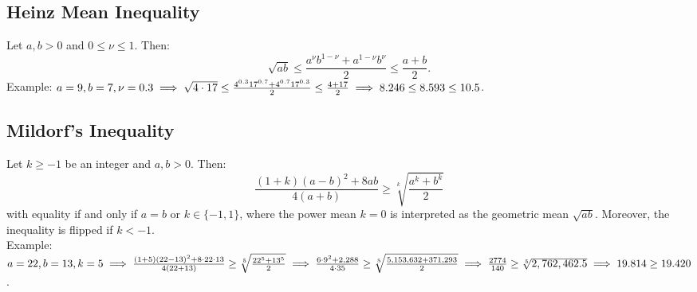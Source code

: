 \documentclass[a4paper,11pt]{article}
\begin{document}
\subsection{Heinz Mean Inequality}
\begin{tcolorbox}[breakable]
    Let $a,b>0$ and $0\leq\nu\leq1$. Then:
    \[
    \sqrt{ab} \leq \frac{a^{\nu}b^{1-\nu} + a^{1-\nu}b^{\nu}}{2} \leq \frac{a+b}{2}.
    \]
    Example: $\textstyle a=9,b=7,\nu=0.3 \\[6pt]
    \implies \sqrt{4\cdot17} \leq \frac{4^{0.3}17^{0.7} + 4^{0.7}17^{0.3}}{2} \leq \frac{4+17}{2} \implies 8.246 \leq 8.593 \leq 10.5$.
\end{tcolorbox}


\subsection{Mildorf's Inequality}
\begin{tcolorbox}[breakable]
    Let $k\geq-1$ be an integer and $a,b>0$. Then:
    \[
    \frac{(1+k)(a-b)^2+8ab}{4(a+b)} \geq \sqrt[k]{\frac{a^k+b^k}{2}}
    \]
    with equality if and only if $a=b$ or $k\in\{-1,1\}$, where the power mean $k=0$ is interpreted as the geometric mean $\sqrt{ab}$. Moreover, the inequality is flipped if $k<-1$. \\[6pt]
    Example: $\textstyle a=22, b=13,k=5 \\[6pt]
    \implies \frac{(1+5)(22-13)^2+8\cdot22\cdot13}{4(22+13)} \geq \sqrt[5]{\frac{22^5+13^5}{2}} \implies \frac{6\cdot9^2+2,288}{4\cdot35} \geq \sqrt[5]{\frac{5,153,632+371,293}{2}} \\[6pt]
    \implies \frac{2774}{140} \geq \sqrt[5]{2,762,462.5} \implies 19.814 \geq 19.420$.
\end{tcolorbox}
\end{document}
